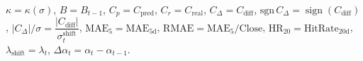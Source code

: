 \begin{threeparttable}
{\begin{tabular}{lrrrrrrrrrrrrr}
\bottomrule
\end{tabular}
}%
\begin{tablenotes}\footnotesize
\item $\kappa=\kappa(\sigma)$, $B=B_{t-1}$, $C_p=C_{\text{pred}}$, $C_r=C_{\text{real}}$, $C_\Delta=C_{\text{diff}}$, $\mathrm{sgn}\,C_\Delta=\operatorname{sign}(C_{\text{diff}})$, $|C_\Delta|/\sigma=\dfrac{|C_{\text{diff}}|}{\sigma_t^{\text{shift}}}$, $\mathrm{MAE}_5=\mathrm{MAE}_{5\text{d}}$, $\mathrm{RMAE}= \mathrm{MAE}_5 / \text{Close}$, $\mathrm{HR}_{20}=\mathrm{HitRate}_{20\text{d}}$, 
$\lambda_{\text{shift}}=\lambda_t$, 
$\Delta\alpha_t=\alpha_t-\alpha_{t-1}$.
\end{tablenotes}
\end{threeparttable}
\endgroup
